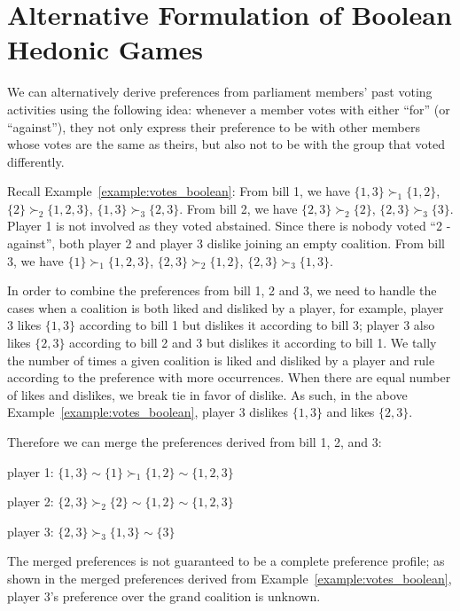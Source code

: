 
\chapter{Alternative Formulation of Boolean Hedonic Games}
\label{append:alternative_boolean}
\vspace*{2em}

We can alternatively derive preferences from parliament members' past voting
activities using the following idea:
whenever a member votes with either ``for'' (or ``against''), they not only
express their preference to be with other members whose votes are the same
as theirs, but also not to be with the group that voted differently.

Recall Example~\ref{example:votes_boolean}:
From bill 1, we have $\{1, 3\} \succ_1 \{1, 2\}$, $\{2\} \succ_2 \{1, 2, 3\}$,
$\{1, 3\} \succ_3 \{2, 3\}$.
From bill 2, we have $\{2, 3\} \succ_2 \{2\}$, $\{2, 3\} \succ_3 \{3\}$.
Player 1 is not involved as they voted abstained.
Since there is nobody voted ``2 - against'', both player 2 and player 3 dislike
joining an empty coalition.
From bill 3, we have $\{1\} \succ_1 \{1, 2, 3\}$, $\{2, 3\} \succ_2 \{1, 2\}$,
$\{2, 3\} \succ_3 \{1, 3\}$.

In order to combine the preferences from bill 1, 2 and 3, we need to handle
the cases when a coalition is both liked and disliked by a player, for example,
player 3 likes $\{1, 3\}$ according to bill 1 but dislikes it according to bill 3;
player 3 also likes $\{2, 3\}$ according to bill 2 and 3 but dislikes it
according to bill 1.
We tally the number of times a given coalition is liked and disliked by a
player and rule according to the preference with more occurrences.
When there are equal number of likes and dislikes, we break tie in favor of dislike.
As such, in the above Example~\ref{example:votes_boolean}, player 3 dislikes
$\{1, 3\}$ and likes $\{2, 3\}$.

Therefore we can merge the preferences derived from bill 1, 2, and 3:

player 1: $\{1, 3\} \sim \{1\} \succ_1 \{1, 2\} \sim \{1, 2, 3\}$

player 2: $\{2, 3\} \succ_2 \{2\} \sim \{1, 2\} \sim \{1, 2, 3\}$

player 3: $\{2, 3\} \succ_3 \{1, 3\} \sim \{3\}$

The merged preferences is not guaranteed to be a complete preference profile;
as shown in the merged preferences derived from Example~\ref{example:votes_boolean},
player 3's preference over the grand coalition is unknown.

